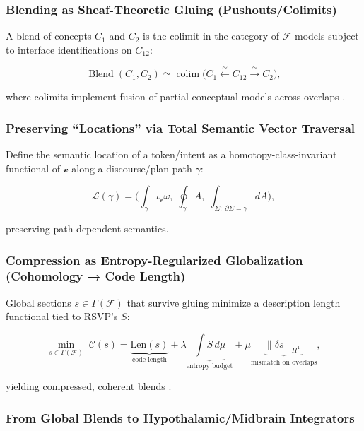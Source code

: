 \documentclass[12pt]{article}
\begin{document}
\subsubsection{Blending as Sheaf-Theoretic Gluing (Pushouts/Colimits)}

A blend of concepts $C_1$ and $C_2$ is the colimit in the category of $\mathcal{F}$-models subject to interface identifications on $C_{12}$:

\[
\operatorname{Blend}(C_1,C_2) \simeq \operatorname{colim}\bigl( C_1 \xleftarrow{\;\sim\;} C_{12} \xrightarrow{\;\sim\;} C_2 \bigr),
\]

where colimits implement fusion of partial conceptual models across overlaps \citep{Lurie2009}.

\subsubsection{Preserving “Locations” via Total Semantic Vector Traversal}

Define the semantic location of a token/intent as a homotopy-class-invariant functional of $\mathcal{v}$ along a discourse/plan path $\gamma$:

\[
\mathcal{L}(\gamma) = \Big( \int_{\gamma} \iota_{\mathcal{v}}\omega,\; \oint_{\gamma} A,\; \int_{\Sigma:\;\partial\Sigma=\gamma} dA \Big),
\]

preserving path-dependent semantics.

\subsubsection{Compression as Entropy-Regularized Globalization (Cohomology → Code Length)}

Global sections $s \in \Gamma(\mathcal{F})$ that survive gluing minimize a description length functional tied to RSVP’s $S$:

\[
\min_{s\in \Gamma(\mathcal{F})}\; \mathcal{C}(s) = \underbrace{\mathrm{Len}(s)}_{\text{code length}} + \lambda \underbrace{\int \! S\, d\mu}_{\text{entropy budget}} + \mu \underbrace{\| \delta s \|_{H^1}}_{\text{mismatch on overlaps}},
\]

yielding compressed, coherent blends \citep{Tsallis1988}.

\subsubsection{From Global Blends to Hypothalamic/Midbrain Integrators}
\end{document}
